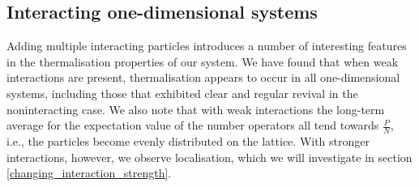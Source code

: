 \documentclass[a4paper, 10pt]{article}
\theoremstyle{plain}
\begin{document}
\subsection{Interacting one-dimensional systems}
Adding multiple interacting particles introduces a number of interesting
features in the thermalisation properties of our system. We have found that
when weak interactions are present, thermalisation appears to occur in all
one-dimensional systems, including those that exhibited clear and regular
revival in the noninteracting case. We also note that with weak
interactions the long-term average for the expectation value of the number
operators all tend towards $\frac{P}{N}$, i.e., the particles become evenly
distributed on the lattice.
With stronger interactions, however, we observe localisation, which we will
investigate in section \ref{changing_interaction_strength}.
\end{document}
